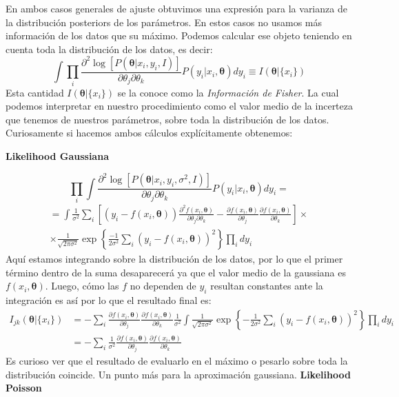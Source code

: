 \documentclass[aps,onecolumn,12pt,notitlepage]{revtex4-1}
\begin{document}
En ambos casos generales de ajuste obtuvimos una expresión para la varianza de la distribución posteriors de los parámetros. En estos casos no usamos más información de los datos que su máximo. Podemos calcular ese objeto teniendo en cuenta toda la distribución de los datos, es decir:
\begin{equation}
\int \prod_{i}  \frac{\partial^{2} \log \left[P\left(\boldsymbol{\theta} | x_{i},y_{i},I \right)\right]}{ \partial \theta_{j} \partial \theta_{k}}  P(y_{i}|x_{i},\boldsymbol{\theta}) dy_{i} \equiv I(\boldsymbol{\theta}|\{x_{i}\})
\end{equation}
Esta cantidad $I(\boldsymbol{\theta}|\{x_{i}\})$ se la conoce como la \textit{Información de Fisher}. La cual podemos interpretar en nuestro procedimiento como el valor medio de la incerteza que tenemos de nuestros parámetros, sobre toda la distribución de los datos. Curiosamente si hacemos ambos cálculos explícitamente obtenemos:

\textbf{Likelihood  Gaussiana}

\begin{equation}
\prod_{i} \int  \frac{\partial^{2}\log \left[P\left(\boldsymbol{\theta} | x_{i},y_{i} ,\sigma^{2},I \right)\right]}{ \partial \theta_{j} \partial \theta_{k}}   P(y_{i}|{x_{i}},\boldsymbol{\theta}) dy_{i} =
\end{equation}
\begin{align}
= \int \frac{1}{\sigma^2} \sum_{i} \left[ \left(y_{i} - f(x_{i},\boldsymbol{\theta} ) \right) \frac{\partial^2 f(x_{i},\boldsymbol{\theta})}{\partial \theta_{j} \partial \theta_{k}}  - \frac{\partial f(x_{i},\boldsymbol{\theta})}{\partial \theta_{j}} \frac{\partial f(x_{i},\boldsymbol{\theta})}{\partial \theta_{k}}\right] \times \\ \times \frac{1}{\sqrt{2\pi\sigma^{2}}} \exp \left\{\frac{-1}{2\sigma^2} \sum_{i} \left(y_{i} - f(x_{i},\boldsymbol{\theta})\right)^2 \right\} \prod_{i} dy_{i}
\end{align}
Aquí estamos integrando sobre la distribución de los datos, por lo que el primer término dentro de la suma desaparecerá ya que el valor medio de la gaussiana es $f(x_{i},\boldsymbol{\theta})$. Luego, cómo las $f$ no dependen de $y_{i}$ resultan constantes ante la integración es así por lo que el resultado final es:
\begin{align}
I_{jk}(\boldsymbol{\theta}|\{ x_{i} \}) &= - \sum_{i} \frac{\partial f(x_{i},\boldsymbol{\theta})}{\partial \theta_{j}} \frac{\partial f(x_{i},\boldsymbol{\theta})}{\partial \theta_{k}} \frac{1}{\sigma^{2}}\int \frac{1}{\sqrt{2\pi\sigma^{2}}} \exp \left\{-\frac{1}{2\sigma^2} \sum_{i} \left(y_{i} - f(x_{i},\boldsymbol{\theta})\right)^2 \right\} \prod_{i} dy_{i}\\
 &=  -\sum_{i} \frac{1}{\sigma^{2}} \frac{\partial f(x_{i},\boldsymbol{\theta})}{\partial \theta_{j}} \frac{\partial f(x_{i},\boldsymbol{\theta})}{\partial \theta_{k}} 
\end{align}
Es curioso ver que el resultado de evaluarlo en el máximo o pesarlo sobre toda la distribución coincide. Un punto más para la aproximación gaussiana.
\newpage
\textbf{Likelihood  Poisson}
\end{document}
